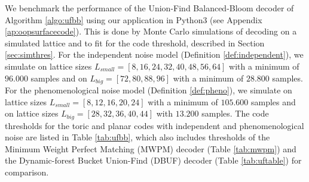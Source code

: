 We benchmark the performance of the Union-Find Balanced-Bloom decoder of Algorithm \ref{algo:ufbb} using our application in Python3 (see Appendix \ref{ap:oopsurfacecode}). This is done by Monte Carlo simulations of decoding on a simulated lattice and to fit for the code threshold, described in Section \ref{sec:simthres}. For the independent noise model (Definition \ref{def:independent}), we simulate on lattice sizes $L_{small}=[8, 16, 24, 32, 40, 48, 56, 64]$ with a minimum of $96.000$ samples and on $L_{big}=[72, 80, 88, 96]$ with a minimum of $28.800$ samples. For the phenomenological noise model (Definition \ref{def:pheno}), we simulate on lattice sizes $L_{small}=[8,12,16,20,24]$ with a minimum of $105.600$ samples and on lattice sizes $L_{big}=[28, 32, 36, 40, 44]$ with $13.200$ samples. The code thresholds for the toric and planar codes with independent and phenomenological noise are listed in Table \ref{tab:ufbb}, which also includes thresholds of the Minimum Weight Perfect Matching (MWPM) decoder (Table \ref{tab:mwpm}) and the Dynamic-forest Bucket Union-Find (DBUF) decoder (Table \ref{tab:uftable}) for comparison.

